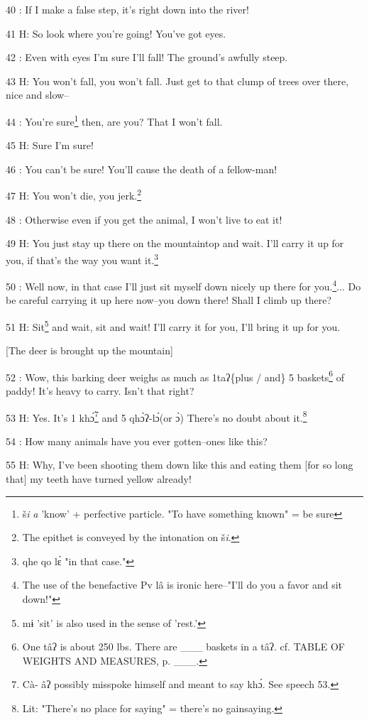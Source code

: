 40  : If I make a false step, it's right down into the river!

41 H: So look where you're going! You've got eyes.

42  : Even with eyes I'm sure I'll fall! The ground's awfully steep.

43 H: You won't fall, you won't fall. Just get to that clump of trees over there,
nice and slow--

44  : You're sure\footnote{š\emph{i} \emph{a} 'know' + perfective particle. "To have something known" = be sure} then, are you? That I won't fall.

45 H: Sure I'm sure!

46  : You can't be sure! You'll cause the death of a fellow-man!

47 H: You won't die, you jerk.\footnote{The epithet is conveyed by the intonation on š\emph{i}.}

48  : Otherwise even if you get the animal, I won't live to eat it!

49 H: You just stay up there on the mountaintop and wait. I'll carry it up for
you, if that's the way you want it.\footnote{qhe qo lɛ̀ "in that case."}

50  : Well now, in that case I'll just sit myself down nicely up there for you.\footnote{The use of the benefactive Pv lâ is ironic here--"I'll do you a favor and sit down!"}...
Do be careful carrying it up here now--you down there! Shall I climb up there?

51 H: Sit\footnote{mɨ 'sit' is also used in the sense of 'rest.'} and wait, sit and wait! I'll carry it for you, I'll bring it up for
you.

[The deer is brought up the mountain]

52  : Wow, this barking  deer weighs as much as 1taʔ\{plus / and\} 5 baskets\footnote{One tâʔ is about 250 lbs. There are \_\_\_ baskets in a tâʔ. cf. TABLE OF WEIGHTS AND MEASURES, p. \_\_\_.}
of paddy! It's heavy to carry. Isn't that right?

53 H: Yes. It's 1 khɔ́\footnote{Cà- âʔ possibly misspoke himself and meant to say khɔ́. See speech 53.} and 5 qhɔ̀ʔ-lɔ́(or ɔ̀) There's no doubt about
it.\footnote{Lit: "There's no place for saying" = there's no gainsaying.}

54  : How many animals have you ever gotten--ones like this?

55 H: Why, I've been shooting them down like this and eating them [for so long
that] my teeth have turned yellow already!

